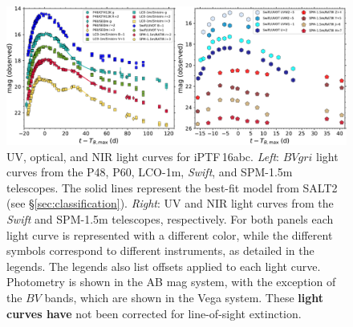 \documentclass[twocolumn]{aastex61}
\newcommand{\abc}{iPTF\,16abc}
\begin{document}
\begin{figure}[ht]
  \centering
  \includegraphics[width=7in]{lightcurve2.pdf}
  \caption{
  UV, optical, and NIR light curves for \abc. \textit{Left}: $BVgri$ light
  curves from the P48, P60, LCO-1m, \textit{Swift}, and SPM-1.5m telescopes.
  The solid lines represent the best-fit model from SALT2 (see
  \S\ref{sec:classification}). \textit{Right}: UV and NIR light curves from
  the \textit{Swift} and SPM-1.5m telescopes, respectively. For both panels
  each light curve is represented with a different color, while the different
  symbols correspond to different instruments, as detailed in the legends. The
  legends also list offsets applied to each light curve. Photometry is shown
  in the AB mag system, with the exception of the $BV$ bands, which are shown
  in the Vega system. These \textbf{light curves have} not been corrected for
  line-of-sight extinction.}
  \label{fig:ugly_LC}
\end{figure}



\end{document}
